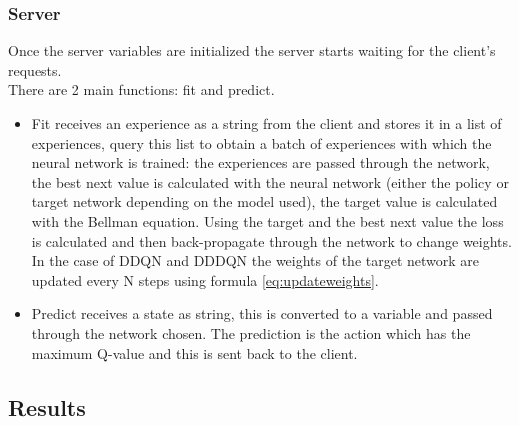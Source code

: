 \documentclass[14pt]{extarticle}
\def\sp{\vspace{5pt}}
\begin{document}
\begin{flushleft}
\subsubsection{Server}
Once the server variables are initialized the server starts waiting for the client's requests. \\
There are 2 main functions: fit and predict.
\begin{itemize}
\item Fit receives an experience as a string from the client and stores it in a list of experiences, query this list to obtain a batch of experiences with which the neural network is trained: the experiences are passed through the network, the best next value is calculated with the neural network (either the policy or target network depending on the model used), the target value is calculated with the Bellman equation. Using the target and the best next value the loss is calculated and then back-propagate through the network to change weights. \\
In the case of DDQN and DDDQN the weights of the target network are updated every N steps using formula \ref{eq:updateweights}.
\item Predict receives a state as string, this is converted to a variable and passed through the network chosen. The prediction is the action which has the maximum Q-value and this is sent back to the client.
\end{itemize}

\end{flushleft}

\newpage
\begin{center}
	\section{Results}
	\sp
\end{center}
\end{document}
